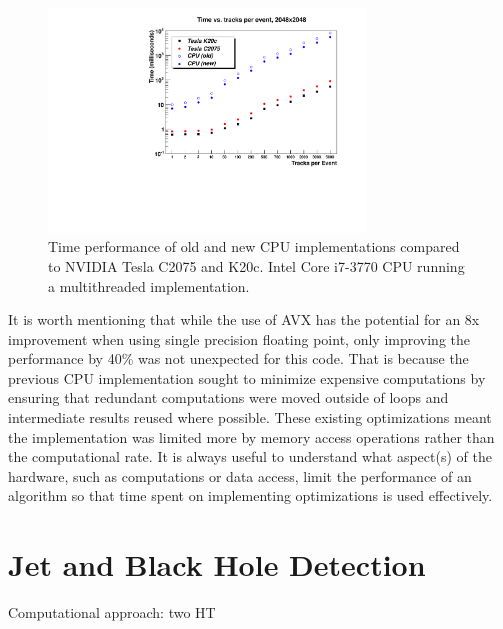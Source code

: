 \documentclass{JINST}
\begin{document}
\begin{figure}[!Hhtb]
\begin{center}
\includegraphics[width=0.75\textwidth]{figs/TimePerformance.pdf} 
\caption{Time performance of old and new CPU implementations compared to NVIDIA Tesla C2075 and K20c.  Intel Core i7-3770 CPU running a multithreaded implementation.\label{fig:TimePerformance}}
\end{center}
\end{figure}

It is worth mentioning that while the use of AVX has the potential for an 8x improvement when using single precision floating point, only improving the performance by 40\% was not unexpected for this code.  That is because the previous CPU implementation sought to minimize expensive computations by ensuring that redundant computations were moved outside of loops and intermediate results reused where possible.  These existing optimizations meant the implementation was limited more by memory access operations rather than the computational rate.  It is always useful to understand what aspect(s) of the hardware, such as computations or data access, limit the performance of an algorithm so that time spent on implementing optimizations is used effectively.

\section{Jet and Black Hole Detection}

Computational approach: two HT
\end{document}
